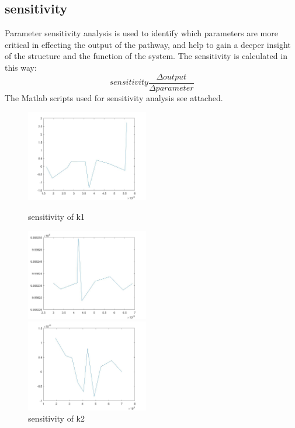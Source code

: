 \subsection{sensitivity }
Parameter sensitivity analysis is used to identify which parameters are more critical in effecting the output of the pathway, and help to gain a deeper insight of the structure and the function of the system. The sensitivity is calculated in this way:
\begin{equation}
sensitivity\frac{\Delta output}{\Delta parameter} 
\end{equation}
The Matlab scripts used for sensitivity analysis see attached.
\begin{figure}
	\centering
	\begin{varwidth}[t]{\textwidth}
		\vspace{0pt}
		\includegraphics[height=4cm]{s1.jpg}
	\end{varwidth}%
	\caption{sensitivity of k1}
	\begin{varwidth}[t]{\textwidth}
		\vspace{0pt}
		\includegraphics[height=4cm]{s2.jpg}
	\end{varwidth}
	\caption{sensitivity of k2}
	\begin{varwidth}[t]{\textwidth}
		\vspace{0pt}
		\includegraphics[height=4cm]{s3.jpg}

\end{varwidth}
\end{figure}

